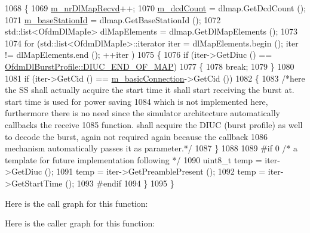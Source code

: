 \begin{DoxyCode}
1068 \{
1069   \hyperlink{classns3_1_1SubscriberStationNetDevice_ad942e72712e5030482e1e21e6f103a0f}{m\_nrDlMapRecvd}++;
1070   \hyperlink{classns3_1_1SubscriberStationNetDevice_a6ccc4320d632d7e792f1e52f82f4f932}{m\_dcdCount} = dlmap.GetDcdCount ();
1071   \hyperlink{classns3_1_1SubscriberStationNetDevice_a9745729222112443a4b527f681537c48}{m\_baseStationId} = dlmap.GetBaseStationId ();
1072   std::list<OfdmDlMapIe> dlMapElements = dlmap.GetDlMapElements ();
1073 
1074   \textcolor{keywordflow}{for} (std::list<OfdmDlMapIe>::iterator iter = dlMapElements.begin (); iter != dlMapElements.end (); ++iter
      )
1075     \{
1076       \textcolor{keywordflow}{if} (iter->GetDiuc () == \hyperlink{classns3_1_1OfdmDlBurstProfile_a4769c73985bf918ecd21180081471a00ac230357d582ca5c2f0344f41b8c081c9}{OfdmDlBurstProfile::DIUC\_END\_OF\_MAP})
1077         \{
1078           \textcolor{keywordflow}{break};
1079         \}
1080 
1081       \textcolor{keywordflow}{if} (iter->GetCid () == \hyperlink{classns3_1_1SubscriberStationNetDevice_ae166a9acaa0e8d720a106491ba9ea2fc}{m\_basicConnection}->GetCid ())
1082         \{
1083           \textcolor{comment}{/*here the SS shall actually acquire the start time it shall start receiving the burst at. start
       time is used for power saving}
1084 \textcolor{comment}{           which is not implemented here, furthermore there is no need since the simulator architecture
       automatically callbacks the receive}
1085 \textcolor{comment}{           function. shall acquire the DIUC (burst profile) as well to decode the burst, again not required
       again because the callback}
1086 \textcolor{comment}{           mechanism automatically passes it as parameter.*/}
1087         \}
1088 
1089 \textcolor{preprocessor}{#if 0 }\textcolor{comment}{/* a template for future implementation following */}\textcolor{preprocessor}{}
1090       uint8\_t temp = iter->GetDiuc ();
1091       temp = iter->GetPreamblePresent ();
1092       temp = iter->GetStartTime ();
1093 \textcolor{preprocessor}{#endif}
1094     \}
1095 \}
\end{DoxyCode}


Here is the call graph for this function\+:




Here is the caller graph for this function\+:


